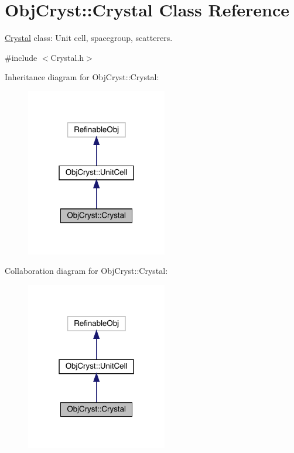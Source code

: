 \hypertarget{class_obj_cryst_1_1_crystal}{}\section{Obj\+Cryst\+::Crystal Class Reference}
\label{class_obj_cryst_1_1_crystal}


\mbox{\hyperlink{class_obj_cryst_1_1_crystal}{Crystal}} class\+: Unit cell, spacegroup, scatterers.  




{\ttfamily \#include $<$Crystal.\+h$>$}



Inheritance diagram for Obj\+Cryst\+::Crystal\+:
\nopagebreak
\begin{figure}[H]
\begin{center}
\leavevmode
\includegraphics[width=175pt]{class_obj_cryst_1_1_crystal__inherit__graph}
\end{center}
\end{figure}


Collaboration diagram for Obj\+Cryst\+::Crystal\+:
\nopagebreak
\begin{figure}[H]
\begin{center}
\leavevmode
\includegraphics[width=175pt]{class_obj_cryst_1_1_crystal__coll__graph}
\end{center}
\end{figure}
